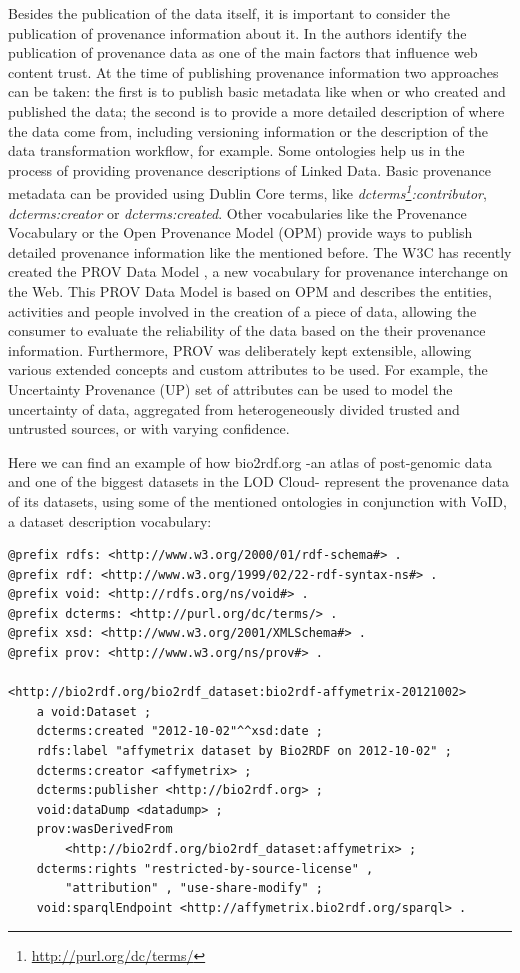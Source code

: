 Besides the publication of the data itself, it is important to consider the publication of provenance  information about it. In \cite{gil_towards_2007} the authors identify the publication of provenance data as one of the main factors that influence web content trust. At the time of publishing provenance information two approaches can be taken: the first is to publish basic metadata like when or who created and published the data; the second is to provide a more detailed description of where the data come from, including versioning information or the description of the data transformation workflow, for example. Some ontologies help us in the process of providing provenance descriptions of Linked Data. Basic provenance metadata can be provided using Dublin Core terms, like \textit{dcterms\footnote{\url{http://purl.org/dc/terms/}}:contributor}, \textit{dcterms:creator} or \textit{dcterms:created}. Other vocabularies like the Provenance Vocabulary \cite{hartig_provenance_2009} or the Open Provenance Model (OPM) \cite{moreau_opm_2011} provide ways to publish detailed provenance information like the mentioned before. The W3C has recently created the PROV Data Model \cite{belhajjame_prov_2013}, a new vocabulary for provenance interchange on the Web. This PROV Data Model is based on OPM and describes the entities, activities and people involved in the creation of a piece of data, allowing the consumer to evaluate the reliability of the data based on the their provenance information. Furthermore, PROV was deliberately kept extensible, allowing various extended concepts and custom attributes to be used. For example, the Uncertainty Provenance (UP) \cite{de_nies_modeling_2013} set of attributes can be used to model the uncertainty of data, aggregated from heterogeneously divided trusted and untrusted sources, or with varying confidence.

Here we can find an example of how bio2rdf.org -an atlas of post-genomic data and one of the biggest datasets in the LOD Cloud- represent the provenance data of its datasets, using some of the mentioned ontologies in conjunction with VoID, a dataset description vocabulary:

\begin{lstlisting}
@prefix rdfs: <http://www.w3.org/2000/01/rdf-schema#> .
@prefix rdf: <http://www.w3.org/1999/02/22-rdf-syntax-ns#> .
@prefix void: <http://rdfs.org/ns/void#> .
@prefix dcterms: <http://purl.org/dc/terms/> .
@prefix xsd: <http://www.w3.org/2001/XMLSchema#> .
@prefix prov: <http://www.w3.org/ns/prov#> .

<http://bio2rdf.org/bio2rdf_dataset:bio2rdf-affymetrix-20121002>
    a void:Dataset ;
    dcterms:created "2012-10-02"^^xsd:date ;
    rdfs:label "affymetrix dataset by Bio2RDF on 2012-10-02" ;
    dcterms:creator <affymetrix> ;
    dcterms:publisher <http://bio2rdf.org> ;
    void:dataDump <datadump> ;
    prov:wasDerivedFrom
        <http://bio2rdf.org/bio2rdf_dataset:affymetrix> ;
    dcterms:rights "restricted-by-source-license" ,
        "attribution" , "use-share-modify" ;
    void:sparqlEndpoint <http://affymetrix.bio2rdf.org/sparql> .
\end{lstlisting}

